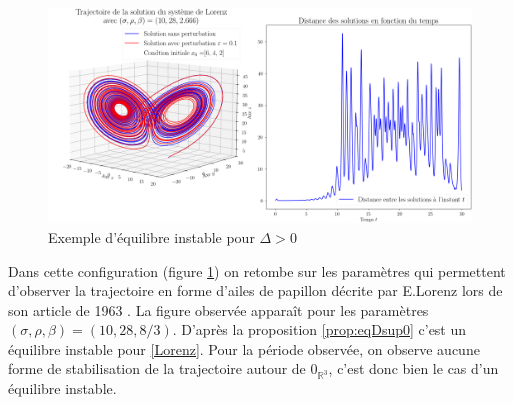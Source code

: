 \documentclass{article}
\newcommand{\R}{\mathbb{R}}
\newtheorem[M , nocut]{prop}{Proposition}[section]
\newtheorem[M , nocut]{definition}{Définition}
\newtheorem[M , nocut]{lemme}{Lemme}
\newtheorem[L , nocut]{thm}{Théoreme}
\newtheorem[M , nocut]{cor}{Corollaire}
\begin{document}
\begin{figure}[!ht]
    \centering
    \includegraphics[width = \textwidth]{EqINS-Dsup0}
    \caption{Exemple d'équilibre instable pour $\Delta>0$}
    \label{fig:EqINS-Dsup0}
\end{figure}
Dans cette configuration (figure \ref{fig:EqINS-Dsup0}) on retombe sur les paramètres qui permettent d'observer la trajectoire en forme d'ailes de papillon décrite par E.Lorenz lors de son article de 1963 \cite{edward_n_lorenz_deterministic_1963}. La figure observée apparaît pour les paramètres $(\sigma,\rho,\beta) = (10,28,8/3)$. D'après la proposition \ref{prop:eqDsup0} c'est un équilibre instable pour \eqref{Lorenz}. Pour la période observée, on observe aucune forme de stabilisation de la trajectoire autour de $0_{\R^3}$, c'est donc bien le cas d'un équilibre instable.
\end{document}
